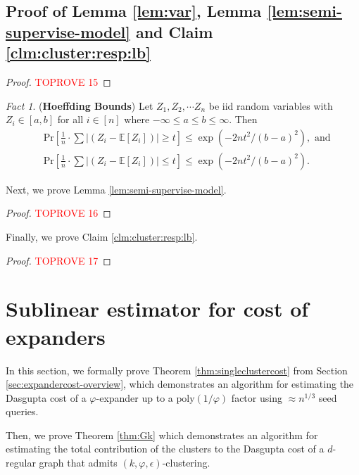 \documentclass[letterpaper,11pt]{article}
\newcommand{\E}{\mathbb{E}}
\theoremstyle{plain}
\theoremstyle{definition}
\theoremstyle{remark}
\newtheorem{fact}{Fact}
\newcommand{\poly}{\text{poly}}
\begin{document}
 \subsection{Proof of Lemma \ref{lem:var}, Lemma \ref{lem:semi-supervise-model} and Claim \ref{clm:cluster:resp:lb}} \label{sec:hoeffding:proof}
\lemhoeffding*

\begin{proof}\textcolor{red}{TOPROVE 15}\end{proof}

\begin{fact} \label{fact:hoeffding} (\textbf{Hoeffding Bounds})
	Let $Z_1, Z_2, \cdots Z_n$ be iid random variables with $Z_i \in [a,b]$ for all $i \in [n]$
	where $-\infty \leq a \leq b \leq \infty$. Then
	\begin{align*}
		&\text{Pr} \left[\frac{1}{n} \cdot \sum |(Z_i - \E[Z_i])| \geq t \right] \leq \exp(-2nt^2/(b-a)^2), \text{ and} \\
		&\text{Pr} \left[\frac{1}{n} \cdot \sum |(Z_i - \E[Z_i])| \leq t \right] \leq \exp(-2nt^2/(b-a)^2). 
	\end{align*}
\end{fact}
 
Next, we prove Lemma \ref{lem:semi-supervise-model}.
\lemsemisupevise*
\begin{proof}\textcolor{red}{TOPROVE 16}\end{proof}

Finally, we prove Claim \ref{clm:cluster:resp:lb}. 
\clmclusterresp*
\begin{proof}\textcolor{red}{TOPROVE 17}\end{proof}
 
\section{Sublinear estimator for cost of expanders}
\label{sec:exp-cost}
In this section, we formally prove Theorem \ref{thm:singleclustercost} from Section \ref{sec:expandercost-overview}, which demonstrates an algorithm for estimating the Dasgupta cost of a $\varphi$-expander up to a $\poly(1/\varphi)$ factor using $\approx n^{1/3}$ seed queries. 

Then, we prove Theorem \ref{thm:Gk} which demonstrates an algorithm for estimating the total contribution of the clusters to the Dasgupta cost of a $d$-regular graph that admits $(k,\varphi, \epsilon)$-clustering. 
\singleclustercost*

\totalclustercost*
\end{document}
